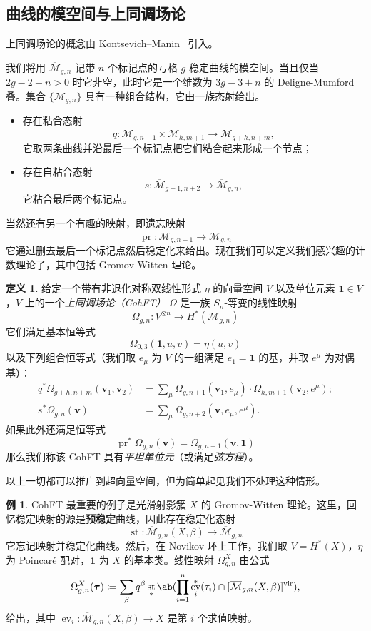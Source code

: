 \documentclass{amsart}
\theoremstyle{definition}
\newtheorem{defn}[thm]{定义}
\newtheorem{exm}[thm]{例}
\theoremstyle{remark}
\theoremstyle{plain}
\theoremstyle{definition}
\theoremstyle{remark}
\newcommand{\Mbar}{\overline{\mathcal{M}}}
\newcommand{\mbf}[1]{\mathbf{#1}}
\newcommand{\bv}{\mbf{v}}
\newcommand{\btau}{\bm{\tau}}
\newcommand{\mr}[1]{\mathrm{#1}}
\newcommand{\1}{\mathbf{1}}
\newcommand{\2}{\mathbf{2}}
\newcommand{\3}{\mathbf{3}}
\newcommand{\vir}{\mr{vir}}
\DeclareMathOperator{\ev}{ev}
\DeclareMathOperator{\st}{st}
\DeclareMathOperator{\pr}{pr}
\begin{document}
\subsection{曲线的模空间与上同调场论}%
\label{sub:Moduli of curves and CohFTs}

上同调场论的概念由 Kontsevich--Manin~\cite{KM1994} 引入。

我们将用 $\Mbar_{g,n}$ 记带 $n$ 个标记点的亏格 $g$ 稳定曲线的模空间。当且仅当 $2g-2+n > 0$ 时它非空，此时它是一个维数为 $3g-3+n$ 的 Deligne-Mumford 叠。集合 $\{\Mbar_{g,n}\}$ 具有一种组合结构，它由一族态射给出。
\begin{itemize}
    \item 存在粘合态射
        \[q \colon \Mbar_{g,n+1} \times \Mbar_{h, m+1} \to \Mbar_{g+h,n+m}, \]
        它取两条曲线并沿最后一个标记点把它们粘合起来形成一个节点；
    \item 存在自粘合态射 \[s \colon \Mbar_{g-1,n+2} \to \Mbar_{g,n},\]
        它粘合最后两个标记点。
\end{itemize}
当然还有另一个有趣的映射，即遗忘映射
\[ \pr \colon \Mbar_{g,n+1} \to \Mbar_{g,n} \]
它通过删去最后一个标记点然后稳定化来给出。现在我们可以定义我们感兴趣的计数理论了，其中包括 Gromov-Witten 理论。

\begin{defn}
    给定一个带有非退化对称双线性形式 $\eta$ 的向量空间 $V$ 以及单位元素 $\1 \in V$，\(V\) 上的一个\textit{上同调场论（CohFT）} $\Omega$ 是一族 $S_n$-等变的线性映射
    \[ \Omega_{g,n} \colon V^{\otimes n} \to H^*(\Mbar_{g,n}) \]
    它们满足基本恒等式
    \[ \Omega_{0,3}(\1, u,v) = \eta(u,v) \]
    以及下列组合恒等式（我们取 $e_{\mu}$ 为 $V$ 的一组满足 $e_1 = \1$ 的基，并取 $e^{\mu}$ 为对偶基）：
    \begin{align*}
        q^* \Omega_{g+h,n+m}(\bv_1, \bv_2) &= \sum_{\mu} \Omega_{g,n+1}(\bv_1, e_{\mu}) \cdot \Omega_{h,m+1}(  \bv_2, e^{\mu} ); \\
        s^* \Omega_{g,n}(\bv) &= \sum_{\mu} \Omega_{g,n+2}(\bv, e_{\mu}, e^{\mu}).
    \end{align*}
    如果此外还满足恒等式
    \[ \pr^*\Omega_{g,n}(\bv) = \Omega_{g,n+1}(\bv,\1) \]
    那么我们称该 CohFT 具有\textit{平坦单位元}（或满足\textit{弦方程}）。
\end{defn}
以上一切都可以推广到超向量空间，但为简单起见我们不处理这种情形。

\begin{exm}
    CohFT 最重要的例子是光滑射影簇 $X$ 的 Gromov-Witten 理论。这里，回忆稳定映射的源是\textbf{预稳定}曲线，因此存在稳定化态射
    \[ \st \colon \Mbar_{g,n}(X,\beta) \to \Mbar_{g,n} \]
    它忘记映射并稳定化曲线。然后，在 Novikov 环上工作，我们取 $V = H^*(X)$，$\eta$ 为 Poincar\'e 配对，$\1$ 为 $X$ 的基本类。线性映射 $\Omega^X_{g,n}$ 由公式
    \[ \Omega_{g,n}^X(\btau) \coloneqq \sum_{\beta} q^{\beta} \st_* \ab(\prod_{i=1}^n \ev_i^*(\tau_i) \cap [\Mbar_{g,n}(X,\beta)]^{\vir}), \]
    给出，其中 $\ev_i \colon \Mbar_{g,n}(X,\beta) \to X$ 是第 $i$ 个求值映射。
\end{exm}
\end{document}
